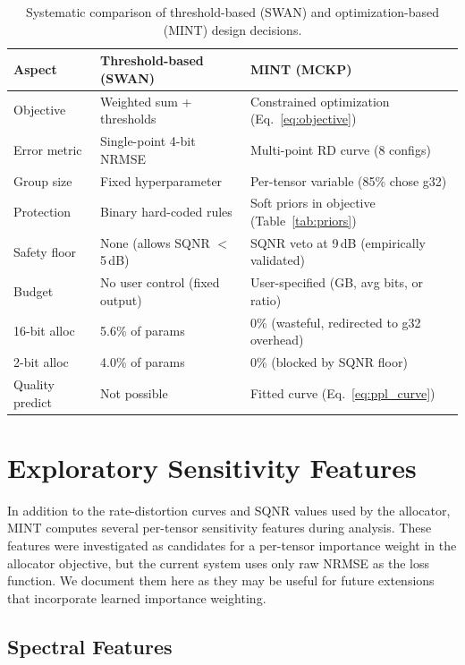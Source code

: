 \documentclass{article}
\begin{document}
\begin{table}[h]
\centering
\small
\caption{Systematic comparison of threshold-based (SWAN) and optimization-based (MINT) design decisions.}
\label{tab:v1v2}
\begin{tabular}{p{3cm}p{4.5cm}p{4.5cm}}
\toprule
Aspect & Threshold-based (SWAN) & MINT (MCKP) \\
\midrule
Objective & Weighted sum + thresholds & Constrained optimization (Eq.~\ref{eq:objective}) \\
Error metric & Single-point 4-bit NRMSE & Multi-point RD curve (8 configs) \\
Group size & Fixed hyperparameter & Per-tensor variable (85\% chose g32) \\
Protection & Binary hard-coded rules & Soft priors in objective (Table~\ref{tab:priors}) \\
Safety floor & None (allows SQNR $<$ 5\,dB) & SQNR veto at 9\,dB (empirically validated) \\
Budget & No user control (fixed output) & User-specified (GB, avg bits, or ratio) \\
16-bit alloc & 5.6\% of params & 0\% (wasteful, redirected to g32 overhead) \\
2-bit alloc & 4.0\% of params & 0\% (blocked by SQNR floor) \\
Quality predict & Not possible & Fitted curve (Eq.~\ref{eq:ppl_curve}) \\
\bottomrule
\end{tabular}
\end{table}

\section{Exploratory Sensitivity Features}
\label{app:features}

In addition to the rate-distortion curves and SQNR values used by the allocator, MINT computes several per-tensor sensitivity features during analysis. These features were investigated as candidates for a per-tensor importance weight in the allocator objective, but the current system uses only raw NRMSE as the loss function. We document them here as they may be useful for future extensions that incorporate learned importance weighting.

\subsection{Spectral Features}
\end{document}
